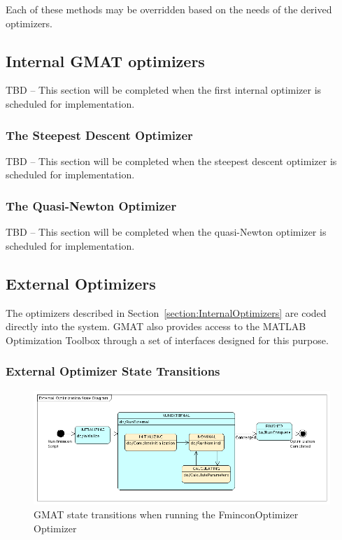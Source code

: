 \noindent Each of these methods may be overridden based on the needs of the derived optimizers.

\subsection{\label{section:InternalOptimizers}Internal GMAT optimizers}

TBD -- This section will be completed when the first internal optimizer is scheduled for
implementation.

\subsubsection{The Steepest Descent Optimizer}

TBD -- This section will be completed when the steepest descent optimizer is scheduled for
implementation.

\subsubsection{The Quasi-Newton Optimizer}

TBD -- This section will be completed when the quasi-Newton optimizer is scheduled for
implementation.

\subsection{External Optimizers}

The optimizers described in Section~\ref{section:InternalOptimizers} are coded directly into the
system.  GMAT also provides access to the MATLAB Optimization Toolbox\cite{opttools} through a set
of interfaces designed for this purpose.

\subsubsection{\label{section:ExternalOptimizationStateMachine}External Optimizer State Transitions}

\begin{figure}
\begin{center}
\includegraphics[390,146]{Images/ExternalOptimizationStateDiagram.png}
\caption{\label{figure:ExternalOptimizationStateDiagram}GMAT state transitions when running the
FminconOptimizer Optimizer}
\end{center}
\end{figure}

